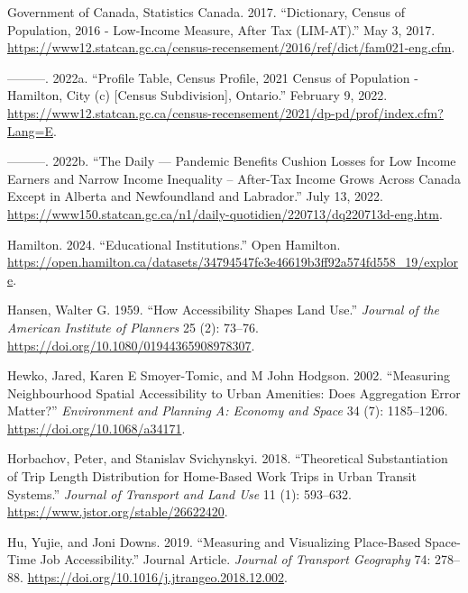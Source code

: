 \documentclass[
default
]{sn-jnl}
\newlength{\cslhangindent}
\newenvironment{CSLReferences}[2] %
 {\begin{list}{}{%
  \setlength{\itemindent}{0pt}
  \setlength{\leftmargin}{0pt}
  \setlength{\parsep}{0pt}
  \ifodd #1
   \setlength{\leftmargin}{\cslhangindent}
   \setlength{\itemindent}{-1\cslhangindent}
  \fi
  \setlength{\itemsep}{#2\baselineskip}}}
 {\end{list}}
\begin{document}
\begin{CSLReferences}{1}{0}
Government of Canada, Statistics Canada. 2017. {``Dictionary, Census of
Population, 2016 - Low-Income Measure, After Tax ({LIM}-{AT}).''} May 3,
2017.
\url{https://www12.statcan.gc.ca/census-recensement/2016/ref/dict/fam021-eng.cfm}.

---------. 2022a. {``Profile Table, Census Profile, 2021 Census of
Population - Hamilton, City (c) {[}Census Subdivision{]}, Ontario.''}
February 9, 2022.
\url{https://www12.statcan.gc.ca/census-recensement/2021/dp-pd/prof/index.cfm?Lang=E}.

---------. 2022b. {``The Daily --- Pandemic Benefits Cushion Losses for
Low Income Earners and Narrow Income Inequality -- After-Tax Income
Grows Across Canada Except in Alberta and Newfoundland and Labrador.''}
July 13, 2022.
\url{https://www150.statcan.gc.ca/n1/daily-quotidien/220713/dq220713d-eng.htm}.

Hamilton. 2024. {``Educational Institutions.''} Open Hamilton.
\url{https://open.hamilton.ca/datasets/34794547fe3e46619b3ff92a574fd558_19/explore}.

Hansen, Walter G. 1959. {``How {Accessibility Shapes Land Use}.''}
\emph{Journal of the American Institute of Planners} 25 (2): 73--76.
\url{https://doi.org/10.1080/01944365908978307}.

Hewko, Jared, Karen E Smoyer-Tomic, and M John Hodgson. 2002.
{``Measuring Neighbourhood Spatial Accessibility to Urban Amenities:
Does Aggregation Error Matter?''} \emph{Environment and Planning A:
Economy and Space} 34 (7): 1185--1206.
\url{https://doi.org/10.1068/a34171}.

Horbachov, Peter, and Stanislav Svichynskyi. 2018. {``Theoretical
Substantiation of Trip Length Distribution for Home-Based Work Trips in
Urban Transit Systems.''} \emph{Journal of Transport and Land Use} 11
(1): 593--632. \url{https://www.jstor.org/stable/26622420}.

Hu, Yujie, and Joni Downs. 2019. {``Measuring and Visualizing
Place-Based Space-Time Job Accessibility.''} Journal Article.
\emph{Journal of Transport Geography} 74: 278--88.
\url{https://doi.org/10.1016/j.jtrangeo.2018.12.002}.


\end{CSLReferences}
\end{document}
